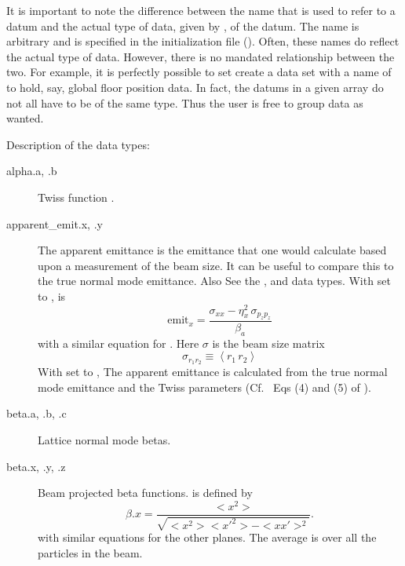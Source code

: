 It is important to note the difference between the  name that is used to refer to a datum
and the actual type of data, given by , of the datum. The  name is arbitrary
and is specified in the \tao initialization file (). Often, these names do reflect
the actual type of data. However, there is no mandated relationship between the two. For example, it
is perfectly possible to set create a data set with a  name of  to hold, say,
global floor position data. In fact, the datums in a given  array do not all have to be of
the same type. Thus the user is free to group data as wanted.

Description of the data types:

  \begin{description}
  \item[alpha.a, .b] \Newline {}
Twiss function .
  \item[apparent_emit.x, .y] \Newline {}
The apparent emittance is the emittance that one would calculate based
upon a measurement of the beam size\cite{b:emit}. It can be useful to
compare this to the true normal mode emittance. Also See the
,  and  data types.
With  set to ,  is
\begin{equation}
  \text{emit}_x = \frac{\sigma_{xx} - \eta_x^2 \, \sigma_{p_zp_z}}{\beta_a}
\end{equation}
with a similar equation for . Here $\sigma$ is the beam size matrix
\begin{equation}
  \sigma_{r_1r_2} \equiv \left< r_1 \, r_2 \right>
\end{equation}
With  set to , The apparent emittance is
calculated from the true normal mode emittance and the Twiss
parameters (Cf.~ Eqs (4) and (5) of \cite{b:emit}).

  \item[beta.a, .b, .c] \Newline {}
Lattice normal mode betas.

  \item[beta.x, .y, .z] \Newline {}
Beam projected beta functions.  is defined by
\begin{equation}
  \beta.x = \frac{<x^{2}>}{\sqrt{<x^{2}> <x'^{2}> - <x x'>^{2}}}.
\end{equation}
with similar equations for the other planes.
The average \vn{<>} is over all the particles in the beam.


\end{description}
